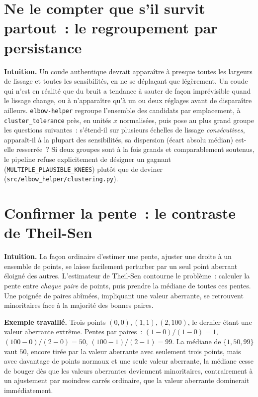 \documentclass[11pt]{article}
\newcommand{\code}[1]{\texttt{#1}}
\begin{document}
\section{Ne le compter que s'il survit partout~: le regroupement par persistance}

\textbf{Intuition.} Un coude authentique devrait apparaître à presque
toutes les largeurs de lissage et toutes les sensibilités, en ne se
déplaçant que légèrement. Un coude qui n'est en réalité que du bruit a
tendance à sauter de façon imprévisible quand le lissage change, ou à
n'apparaître qu'à un ou deux réglages avant de disparaître ailleurs.
\code{elbow-helper} regroupe l'ensemble des candidats par emplacement, à
\code{cluster\_tolerance} près, en unités $x$ normalisées, puis pose au
plus grand groupe les questions suivantes~: s'étend-il sur plusieurs
échelles de lissage \emph{consécutives}, apparaît-il à la plupart des
sensibilités, sa dispersion (écart absolu médian) est-elle resserrée~? Si
deux groupes sont à la fois grands et comparablement soutenus, le pipeline
refuse explicitement de désigner un gagnant
(\code{MULTIPLE\_PLAUSIBLE\_KNEES}) plutôt que de deviner
(\code{src/elbow\_helper/clustering.py}).

\section{Confirmer la pente~: le contraste de Theil-Sen}

\textbf{Intuition.} La façon ordinaire d'estimer une pente, ajuster une
droite à un ensemble de points, se laisse facilement perturber par un seul
point aberrant éloigné des autres. L'estimateur de Theil-Sen contourne le
problème~: calculer la pente entre \emph{chaque paire} de points, puis
prendre la médiane de toutes ces pentes. Une poignée de paires abîmées,
impliquant une valeur aberrante, se retrouvent minoritaires face à la
majorité des bonnes paires.

\textbf{Exemple travaillé.} Trois points $(0,0), (1,1), (2,100)$, le
dernier étant une valeur aberrante extrême. Pentes par paires~:
$(1-0)/(1-0)=1$, $(100-0)/(2-0)=50$, $(100-1)/(2-1)=99$. La médiane de
$\{1, 50, 99\}$ vaut $50$, encore tirée par la valeur aberrante avec
seulement trois points, mais avec davantage de points normaux et une seule
valeur aberrante, la médiane cesse de bouger dès que les valeurs aberrantes
deviennent minoritaires, contrairement à un ajustement par moindres carrés
ordinaire, que la valeur aberrante dominerait immédiatement.
\end{document}
